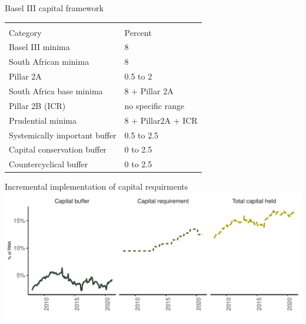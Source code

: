 \documentclass[
  14,
  ignorenonframetext,
  aspectratio=141,
]{beamer}
\begin{document}
\begin{frame}{Basel III capital framework}
\protect\hypertarget{basel-iii-capital-framework}{}
\begin{table}
\centering\begingroup\fontsize{10}{12}\selectfont

\begin{tabular}{>{\raggedright\arraybackslash}p{10cm}l}
\toprule
\multicolumn{2}{c}{Basel III capital requirement structure} \\
\cmidrule(l{3pt}r{3pt}){1-2}
Category & Percent\\
\midrule
Basel III minima & 8\\
South African minima & 8\\
Pillar 2A & 0.5 to 2\\
South Africa base minima & 8 + Pillar 2A\\
Pillar 2B (ICR) & no specific range\\
\addlinespace
Prudential minima & 8 + Pillar2A + ICR\\
Systemically important buffer & 0.5 to 2.5\\
Capital conservation buffer & 0 to 2.5\\
Countercyclical buffer & 0 to 2.5\\
\bottomrule
\end{tabular}
\endgroup{}
\end{table}
\end{frame}

\begin{frame}{Incremental implementation of capital requirments}
\protect\hypertarget{incremental-implementation-of-capital-requirments}{}
\includegraphics{baseIII_and_bank_lending_files/figure-beamer/capital-1.pdf}
\end{frame}
\end{document}
